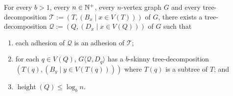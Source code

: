 \documentclass{patmorin}
\renewcommand{\le}{\leqslant}
\newcommand{\torso}[2]{{#1}\langle{#2}\rangle}
\DeclareMathOperator{\height}{height}
\begin{document}
\begin{cor}\label{b_skinny_decomp}
  For every $b>1$, every $n\in\mathbb{N}^+$, every $n$-vertex graph $G$ and every tree-decomposition $\mathcal{T}:=(T,(B_x\mid x\in V(T)))$ of $G$, there exists a tree-decomposition $\mathcal{Q}:=(Q,(D_x\mid x\in V(Q)))$ of $G$ such that
  \begin{enumerate}[nosep,nolistsep,label=\rm(\alph*)]
    \item\label{prop_adhesion}
          each adhesion of $\mathcal{Q}$ is an adhesion of $\mathcal{T}$;
    \item\label{prop_skinny_torso} for each $q\in V(Q)$, $\torso{G}{\mathcal{Q},D_q}$ has a $b$-skinny tree-decomposition $(T(q), (B_y\mid y\in V(T(q))))$ where $T(q)$ is a subtree of $T$; and
    \item\label{prop_geometric} $\height(Q)\le \log_b n$.
  \end{enumerate}
\end{cor}
\end{document}

